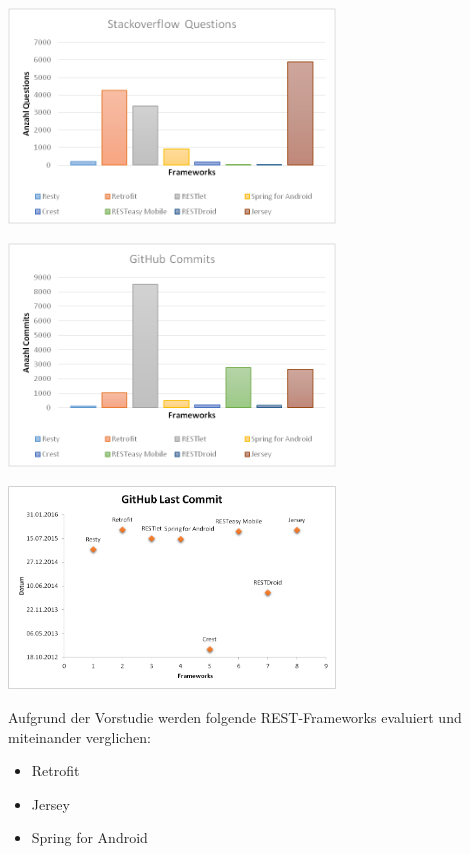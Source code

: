 \begin{minipage}{\textwidth} 
	\centering	
	\includegraphics[width=0.65\textwidth]{figures/stackoverflow_questions.png}
	\label{figure:stackoverflowQuestions}
	\vspace{2ex}
\end{minipage}

\begin{minipage}{\textwidth} 
	\centering	
	\includegraphics[width=0.65\textwidth]{figures/github_commits.png}
	\label{figure:githubCommits}
	\vspace{2ex}
\end{minipage}

\begin{minipage}{\textwidth} 
	\centering	
	\includegraphics[width=0.65\textwidth]{figures/github_lastCommit.png}
	\label{figure:githubLastCommit}
	\vspace{5ex}
\end{minipage}

Aufgrund der Vorstudie werden folgende REST-Frameworks evaluiert und miteinander verglichen:

\begin{itemize}
	\item Retrofit 
	\item Jersey
	\item Spring for Android
\end{itemize}
